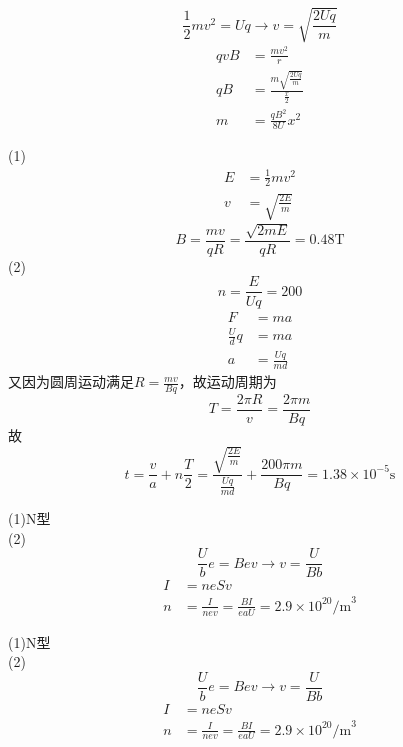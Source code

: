 \documentclass{phyasgn}
\begin{document}
\begin{sol}[2-43]
$$\frac{1}{2}mv^2=Uq\to v=\sqrt{\frac{2Uq}{m}}$$
$$\begin{aligned}
    qvB&=\frac{mv^2}{r}\\
    qB&=\frac{m\sqrt{\frac{2Uq}{m}}}{\frac{x}{2}}\\
    m&=\frac{qB^2}{8U}x^2
\end{aligned}$$
\end{sol}\par

\begin{sol}[2-45]
    (1)$$\begin{aligned}
        E&=\frac{1}{2}mv^2\\
        v&=\sqrt{\frac{2E}{m}}
    \end{aligned}$$
    $$B=\frac{mv}{qR}=\frac{\sqrt{2mE}}{qR}=0.48\text{T}$$
    (2)$$n=\frac{E}{Uq}=200$$
    $$\begin{aligned}
        F&=ma\\
        \frac{U}{d}q&=ma\\
        a&=\frac{Uq}{md}
    \end{aligned}$$
又因为圆周运动满足$R=\frac{mv}{Bq}$，故运动周期为$$T=\frac{2\pi R}{v}=\frac{2\pi m}{Bq}$$
故$$t=\frac{v}{a}+n\frac{T}{2}=\frac{\sqrt{\frac{2E}{m}}}{\frac{Uq}{md}}+\frac{200\pi m}{Bq}=1.38\times 10^{-5}\text{s}$$
\end{sol}

\begin{sol}[2-50]
    (1)N型\\
    (2)$$\frac{U}{b}e=Bev\to v=\frac{U}{Bb}$$
    $$\begin{aligned}
        I&=neSv\\
        n&=\frac{I}{nev}=\frac{BI}{eaU}=2.9\times 10^{20}\text{/m}^3
    \end{aligned}$$
\end{sol}\par

\begin{sol}[2-50]
    (1)N型\\
    (2)$$\frac{U}{b}e=Bev\to v=\frac{U}{Bb}$$
    $$\begin{aligned}
        I&=neSv\\
        n&=\frac{I}{nev}=\frac{BI}{eaU}=2.9\times 10^{20}\text{/m}^3
    \end{aligned}$$
\end{sol}\par
\end{document}
